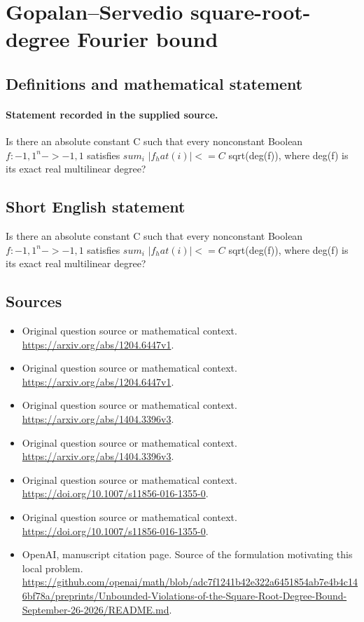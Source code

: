 \documentclass[11pt]{article}
\begin{document}
\section*{Gopalan–Servedio square-root-degree Fourier bound}\label{30007087}
\subsection{Definitions and mathematical statement}
\paragraph{Statement recorded in the supplied source.}
Is there an absolute constant C such that every nonconstant Boolean $f:{-1,1}^n->{-1,1}$ satisfies $sum_i$ $|f_hat({i})|<=C$ sqrt(deg(f)), where deg(f) is its exact real multilinear degree?
\subsection{Short English statement}
Is there an absolute constant C such that every nonconstant Boolean $f:{-1,1}^n->{-1,1}$ satisfies $sum_i$ $|f_hat({i})|<=C$ sqrt(deg(f)), where deg(f) is its exact real multilinear degree?
\subsection{Sources}
\begin{itemize}
\item[S1] Original question source or mathematical context.
\url{https://arxiv.org/abs/1204.6447v1}.
\item[S2] Original question source or mathematical context.
\url{https://arxiv.org/abs/1204.6447v1}.
\item[S3] Original question source or mathematical context.
\url{https://arxiv.org/abs/1404.3396v3}.
\item[S4] Original question source or mathematical context.
\url{https://arxiv.org/abs/1404.3396v3}.
\item[S5] Original question source or mathematical context.
\url{https://doi.org/10.1007/s11856-016-1355-0}.
\item[S6] Original question source or mathematical context.
\url{https://doi.org/10.1007/s11856-016-1355-0}.
\item[S7] OpenAI, manuscript citation page. Source of the formulation motivating this local problem.
\url{https://github.com/openai/math/blob/adc7f1241b42e322a6451854ab7e4b4c146bf78a/preprints/Unbounded-Violations-of-the-Square-Root-Degree-Bound-September-26-2026/README.md}.
\end{itemize}
\end{document}
